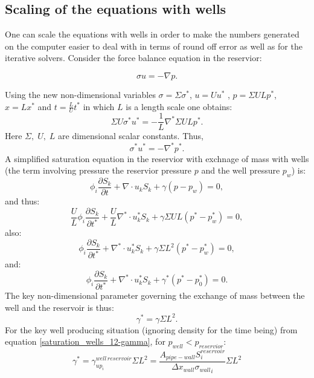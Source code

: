 \subsection{Scaling of the equations with wells} 
\label{well-scaling}

One can scale the equations with wells in order to make the numbers generated on the 
computer easier to deal with in terms of round off error as well as for the iterative 
solvers. 
Consider the force balance equation in the reservior:

\begin{equation}
\sigma u = -\nabla p. 
\end{equation}

Using the new non-dimensional variables $\sigma=\Sigma \sigma^*$, $u=U u^*$ , $p=\Sigma U L p^*$, 
$x=L x^*$ 
and $t=\frac{L}{U} t^*$ in which $L$ is a length scale 
one 
obtains:
\begin{equation}
\Sigma U \sigma^* u^* = -\frac{1}{L} \nabla^*  \Sigma U L p^*. 
\end{equation}
Here $\Sigma,\; U,\; L$ are dimensional scalar constants. 
Thus,  
\begin{equation}
\sigma^* u^* = -\nabla^* p^*. 
\end{equation}
A simplified saturation equation in the reservior with exchnage of mass with wells (the term involving pressure the reservior pressure $p$ and the well pressure $p_w$) is:
\begin{equation}
\phi_i \frac{\partial S_k}{\partial t} 
+ \nabla \cdot u_k S_k
+ \gamma (p-p_w)=0,
\end{equation}
and thus:
\begin{equation}
\frac{U}{L} \phi_i \frac{\partial S_k}{\partial t^*} 
+ \frac{U}{L} \nabla^* \cdot u_k^* S_k
+ \gamma \Sigma U L  (p^*-p^*_w)=0, 
\end{equation}
also:
\begin{equation}
\phi_i \frac{\partial S_k}{\partial t^*} 
+ \nabla^* \cdot u_k^* S_k
+ \gamma \Sigma  L^2  (p^*-p^*_w)=0, 
\end{equation}
and:
\begin{equation}
\phi_i \frac{\partial S_k}{\partial t^*} 
+ \nabla^* \cdot u_k^* S_k
+ \gamma^* (p^*-p^*_0)=0. 
\end{equation}
The key non-dimensional parameter governing the exchange of mass between 
the well and the reservoir is thus: 
\begin{equation}
\gamma^* = \gamma  \Sigma L^2.  
\end{equation}
For the key well producing situation (ignoring density for the time being) from equation  
\ref{saturation_wells_12-gamma}, 
for $p_{well}< p_{reservior}$: 
\begin{equation}
\gamma^* = \gamma_{up_i}^{well\, reservoir}
  \Sigma L^2 
=\frac{A_{pipe-wall}  S_i^{reservoir}   }
{{\Delta x}_{wall}{\sigma_{wall}}_i}
  \Sigma L^2
\end{equation}






